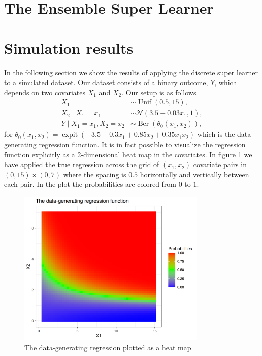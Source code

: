 \documentclass[11pt, a4paper]{article}
\theoremstyle{definition}
\theoremstyle{remark}
\DeclareMathOperator{\expit}{expit}
\begin{document}
\section{The Ensemble Super Learner}
\section{Simulation results} \label{sec:simulations}
In the following section we show the results of applying the discrete super learner to a simulated dataset. Our dataset consists of a binary outcome, $Y$, which depends on two covariates $X_1$ and $X_2$. Our setup is as follows
\begin{align*}
    X_1 &\sim \operatorname{Unif}(0.5, 15),\\
    X_2 \mid X_1 = x_1 &\sim \mathcal{N}(3.5-0.03x_1, 1),\\
    Y \mid X_1 = x_1, X_2 = x_2 &\sim \operatorname{Ber}(\theta_0(x_1, x_2)),
\end{align*}
for $\theta_0(x_1, x_2) = \expit({-3.5 - 0.3x_1 + 0.85x_2 + 0.35x_1x_2})$ which is the data-generating regression function. It is in fact possible to visualize the regression function explicitly as a 2-dimensional heat map in the covariates. In figure \ref{fig:trueplot} we have applied the true regression across the grid of $ (x_1, x_2) $ covariate pairs in $ (0, 15) \times (0,7) $ where the spacing is $ 0.5 $ horizontally and vertically between each pair. In the plot the probabilities are colored from $ 0 $ to $ 1 $. 
\begin{figure}[H]
    \centering
    \includegraphics[width=0.8\textwidth]{figures/trueplot.png}
    \caption{The data-generating regression plotted as a heat map}
    \label{fig:trueplot}
\end{figure}
\end{document}
